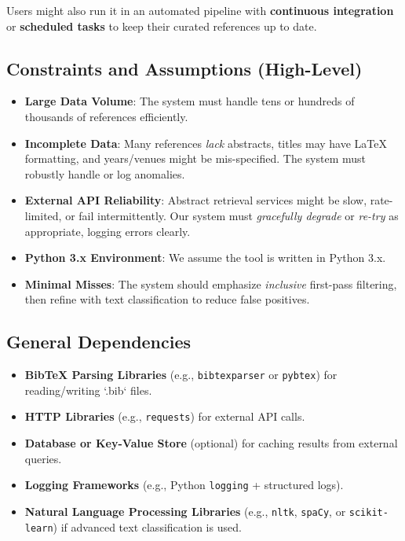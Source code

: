 \documentclass[12pt]{article}
\begin{document}
Users might also run it in an automated pipeline with \textbf{continuous integration} or \textbf{scheduled tasks} to keep their curated references up to date. 

\subsection{Constraints and Assumptions (High-Level)}
\begin{itemize}
  \item \textbf{Large Data Volume}: The system must handle tens or hundreds of thousands of references efficiently.
  \item \textbf{Incomplete Data}: Many references \emph{lack} abstracts, titles may have LaTeX formatting, and years/venues might be mis-specified. The system must robustly handle or log anomalies.
  \item \textbf{External API Reliability}: Abstract retrieval services might be slow, rate-limited, or fail intermittently. Our system must \emph{gracefully degrade} or \emph{re-try} as appropriate, logging errors clearly.
  \item \textbf{Python 3.x Environment}: We assume the tool is written in Python 3.x. 
  \item \textbf{Minimal Misses}: The system should emphasize \emph{inclusive} first-pass filtering, then refine with text classification to reduce false positives.
\end{itemize}

\subsection{General Dependencies}
\begin{itemize}
  \item \textbf{BibTeX Parsing Libraries} (e.g., \texttt{bibtexparser} or \texttt{pybtex}) for reading/writing `.bib` files.
  \item \textbf{HTTP Libraries} (e.g., \texttt{requests}) for external API calls.
  \item \textbf{Database or Key-Value Store} (optional) for caching results from external queries.
  \item \textbf{Logging Frameworks} (e.g., Python \texttt{logging} + structured logs).
  \item \textbf{Natural Language Processing Libraries} (e.g., \texttt{nltk}, \texttt{spaCy}, or \texttt{scikit-learn}) if advanced text classification is used.
\end{itemize}
\end{document}
